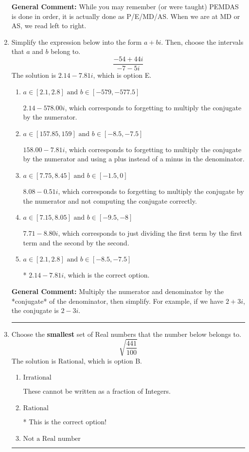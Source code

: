 \documentclass{extbook}[14pt]
\newcommand{\litem}[1]{\item #1

\rule{\textwidth}{0.4pt}}
\begin{document}
\begin{enumerate}
{\textbf{General Comment:} While you may remember (or were taught) PEMDAS is done in order, it is actually done as P/E/MD/AS. When we are at MD or AS, we read left to right.
}
\litem{
Simplify the expression below into the form $a+bi$. Then, choose the intervals that $a$ and $b$ belong to.
\[ \frac{-54 + 44 i}{-7 - 5 i} \]The solution is \( 2.14  - 7.81 i \), which is option E.\begin{enumerate}[label=\Alph*.]
\item \( a \in [2.1, 2.8] \text{ and } b \in [-579, -577.5] \)

 $2.14  - 578.00 i$, which corresponds to forgetting to multiply the conjugate by the numerator.
\item \( a \in [157.85, 159] \text{ and } b \in [-8.5, -7.5] \)

 $158.00  - 7.81 i$, which corresponds to forgetting to multiply the conjugate by the numerator and using a plus instead of a minus in the denominator.
\item \( a \in [7.75, 8.45] \text{ and } b \in [-1.5, 0] \)

 $8.08  - 0.51 i$, which corresponds to forgetting to multiply the conjugate by the numerator and not computing the conjugate correctly.
\item \( a \in [7.15, 8.05] \text{ and } b \in [-9.5, -8] \)

 $7.71  - 8.80 i$, which corresponds to just dividing the first term by the first term and the second by the second.
\item \( a \in [2.1, 2.8] \text{ and } b \in [-8.5, -7.5] \)

* $2.14  - 7.81 i$, which is the correct option.
\end{enumerate}

\textbf{General Comment:} Multiply the numerator and denominator by the *conjugate* of the denominator, then simplify. For example, if we have $2+3i$, the conjugate is $2-3i$.
}
\litem{
Choose the \textbf{smallest} set of Real numbers that the number below belongs to.
\[ \sqrt{\frac{441}{100}} \]The solution is \( \text{Rational} \), which is option B.\begin{enumerate}[label=\Alph*.]
\item \( \text{Irrational} \)

These cannot be written as a fraction of Integers.
\item \( \text{Rational} \)

* This is the correct option!
\item \( \text{Not a Real number} \)


\end{enumerate}}
\end{enumerate}
\end{document}
